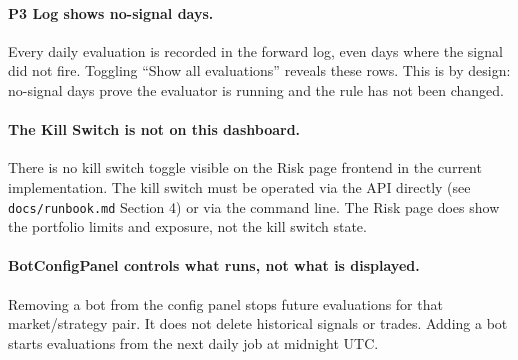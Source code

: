 \documentclass[12pt, a4paper]{article}
\begin{document}
\paragraph{P3 Log shows no-signal days.}
Every daily evaluation is recorded in the forward log, even days where the
signal did not fire. Toggling ``Show all evaluations'' reveals these rows.
This is by design: no-signal days prove the evaluator is running and the rule
has not been changed.

\paragraph{The Kill Switch is not on this dashboard.}
There is no kill switch toggle visible on the Risk page frontend in the
current implementation. The kill switch must be operated via the API directly
(see \texttt{docs/runbook.md} Section 4) or via the command line. The Risk
page does show the portfolio limits and exposure, not the kill switch state.

\paragraph{BotConfigPanel controls what runs, not what is displayed.}
Removing a bot from the config panel stops future evaluations for that
market/strategy pair. It does not delete historical signals or trades. Adding
a bot starts evaluations from the next daily job at midnight UTC.
\end{document}
